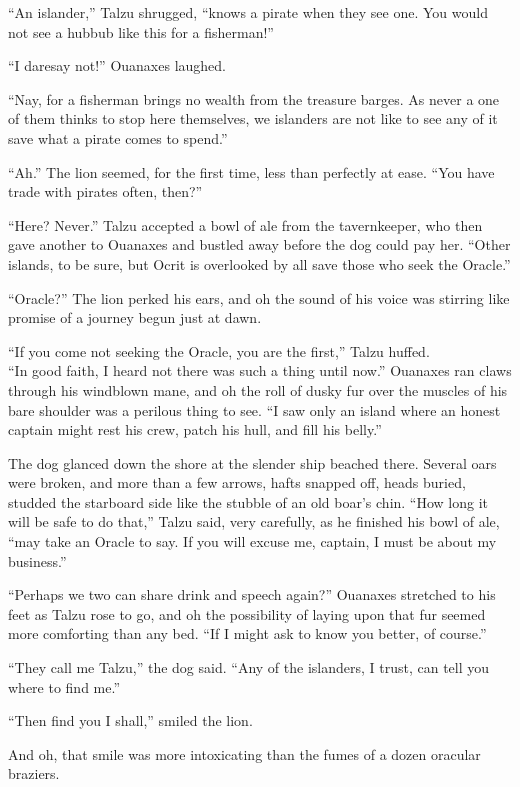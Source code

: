 ``An islander,'' Talzu shrugged, ``knows a pirate when they see one. You would not see a hubbub like this for a fisherman!''

``I daresay not!'' Ouanaxes laughed.

``Nay, for a fisherman brings no wealth from the treasure barges. As never a one of them thinks to stop here themselves, we islanders are not like to see any of it save what a pirate comes to spend.''

``Ah.'' The lion seemed, for the first time, less than perfectly at ease. ``You have trade with pirates often, then?''

``Here? Never.'' Talzu accepted a bowl of ale from the tavernkeeper, who then gave another to Ouanaxes and bustled away before the dog could pay her. ``Other islands, to be sure, but Ocrit is overlooked by all save those who seek the Oracle.''

``Oracle?'' The lion perked his ears, and oh the sound of his voice was stirring like promise of a journey begun just at dawn.

``If you come not seeking the Oracle, you are the first,'' Talzu huffed.\\
``In good faith, I heard not there was such a thing until now.'' Ouanaxes ran claws through his windblown mane, and oh the roll of dusky fur over the muscles of his bare shoulder was a perilous thing to see. ``I saw only an island where an honest captain might rest his crew, patch his hull, and fill his belly.''

The dog glanced down the shore at the slender ship beached there. Several oars were broken, and more than a few arrows, hafts snapped off, heads buried, studded the starboard side like the stubble of an old boar's chin. ``How long it will be safe to do that,'' Talzu said, very carefully, as he finished his bowl of ale, ``may take an Oracle to say. If you will excuse me, captain, I must be about my business.''

``Perhaps we two can share drink and speech again?'' Ouanaxes stretched to his feet as Talzu rose to go, and oh the possibility of laying upon that fur seemed more comforting than any bed. ``If I might ask to know you better, of course.''

``They call me Talzu,'' the dog said. ``Any of the islanders, I trust, can tell you where to find me.''

``Then find you I shall,'' smiled the lion.

And oh, that smile was more intoxicating than the fumes of a dozen oracular braziers.

